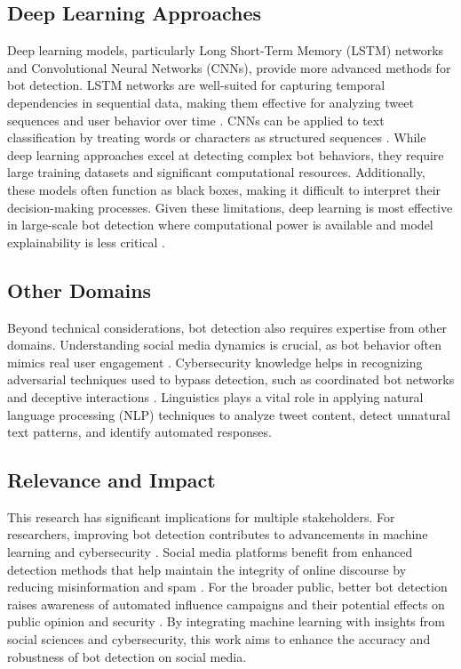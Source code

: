 \documentclass[10pt,twocolumn]{article}
\begin{document}
\subsection{Deep Learning Approaches}
Deep learning models, particularly Long Short-Term Memory (LSTM) networks and Convolutional Neural Networks (CNNs), provide more advanced methods for bot detection. LSTM networks are well-suited for capturing temporal dependencies in sequential data, making them effective for analyzing tweet sequences and user behavior over time \cite{Cai2017}. CNNs can be applied to text classification by treating words or characters as structured sequences \cite{Akyon2019}. While deep learning approaches excel at detecting complex bot behaviors, they require large training datasets and significant computational resources. Additionally, these models often function as black boxes, making it difficult to interpret their decision-making processes. Given these limitations, deep learning is most effective in large-scale bot detection where computational power is available and model explainability is less critical \cite{Adams2017}.

\subsection{Other Domains}
Beyond technical considerations, bot detection also requires expertise from other domains. Understanding social media dynamics is crucial, as bot behavior often mimics real user engagement \cite{Yu2024} \cite{Kenny2022}. Cybersecurity knowledge helps in recognizing adversarial techniques used to bypass detection, such as coordinated bot networks and deceptive interactions \cite{Mbona2023}. Linguistics plays a vital role in applying natural language processing (NLP) techniques to analyze tweet content, detect unnatural text patterns, and identify automated responses.

\subsection{Relevance and Impact}
This research has significant implications for multiple stakeholders. For researchers, improving bot detection contributes to advancements in machine learning and cybersecurity \cite{Kudugunta2018}. Social media platforms benefit from enhanced detection methods that help maintain the integrity of online discourse by reducing misinformation and spam \cite{Hayawi2023}. For the broader public, better bot detection raises awareness of automated influence campaigns and their potential effects on public opinion and security \cite{Hajli2021}. By integrating machine learning with insights from social sciences and cybersecurity, this work aims to enhance the accuracy and robustness of bot detection on social media.
\end{document}
